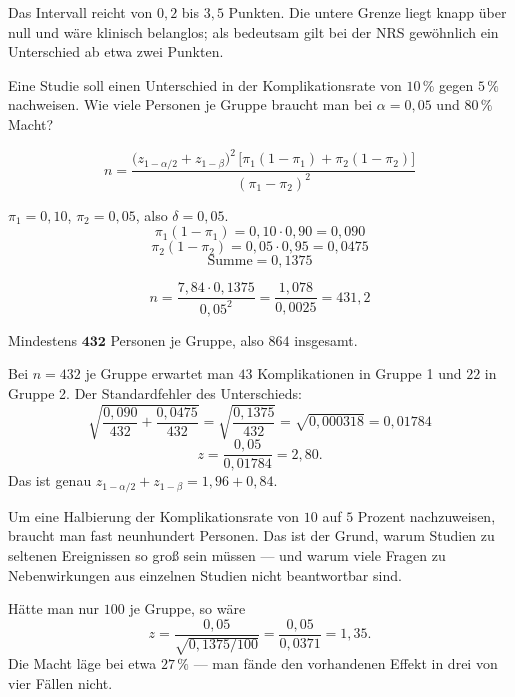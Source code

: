 \begin{aufgabe}
Das Intervall reicht von $0{,}2$ bis $3{,}5$ Punkten. Die untere Grenze liegt knapp über null und wäre klinisch belanglos; als bedeutsam gilt bei der NRS gewöhnlich ein Unterschied ab etwa zwei Punkten.

\begin{center}
\begin{minipage}{0.86\textwidth}
\end{minipage}
\end{center}
\end{aufgabe}

\begin{aufgabe}
Eine Studie soll einen Unterschied in der Komplikationsrate von $10\,\%$ gegen $5\,\%$ nachweisen. Wie viele Personen je Gruppe braucht man bei $\alpha = 0{,}05$ und $80\,\%$ Macht?

\loesung
{}
\[ n = \frac{\bigl(z_{1-\alpha/2}+z_{1-\beta}\bigr)^2\,\bigl[\pi_1(1-\pi_1) + \pi_2(1-\pi_2)\bigr]}{(\pi_1-\pi_2)^2} \]

$\pi_1 = 0{,}10$, $\pi_2 = 0{,}05$, also $\delta = 0{,}05$.
\[ \pi_1(1-\pi_1) = 0{,}10 \cdot 0{,}90 = 0{,}090 \]
\[ \pi_2(1-\pi_2) = 0{,}05 \cdot 0{,}95 = 0{,}0475 \]
\[ \text{Summe} = 0{,}1375 \]

\[ n = \frac{7{,}84 \cdot 0{,}1375}{0{,}05^2} = \frac{1{,}078}{0{,}0025} = 431{,}2 \]

Mindestens $\mathbf{432}$ Personen je Gruppe, also $864$ insgesamt.

Bei $n = 432$ je Gruppe erwartet man $43$ Komplikationen in Gruppe 1 und $22$ in Gruppe 2. Der Standardfehler des Unterschieds:
\[ \sqrt{\frac{0{,}090}{432} + \frac{0{,}0475}{432}} = \sqrt{\frac{0{,}1375}{432}} = \sqrt{0{,}000318} = 0{,}01784 \]
\[ z = \frac{0{,}05}{0{,}01784} = 2{,}80 . \]
Das ist genau $z_{1-\alpha/2} + z_{1-\beta} = 1{,}96 + 0{,}84$. \checkmark

\begin{center}
\begin{minipage}{0.88\textwidth}
Um eine Halbierung der Komplikationsrate von $10$ auf $5$ Prozent nachzuweisen, braucht man fast neunhundert Personen. Das ist der Grund, warum Studien zu seltenen Ereignissen so groß sein müssen --- und warum viele Fragen zu Nebenwirkungen aus einzelnen Studien nicht beantwortbar sind.
\end{minipage}
\end{center}

Hätte man nur $100$ je Gruppe, so wäre
\[ z = \frac{0{,}05}{\sqrt{0{,}1375/100}} = \frac{0{,}05}{0{,}0371} = 1{,}35 . \]
Die Macht läge bei etwa $27\,\%$ --- man fände den vorhandenen Effekt in drei von vier Fällen nicht.
\end{aufgabe}

